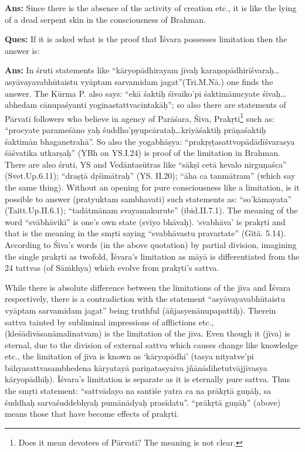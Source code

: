 \textbf{Ans:} Since there is the absence of the activity of creation etc., it is like the lying of a dead serpent skin in the consciousness of Brahman.

\textbf{Ques:} If it is asked what is the proof that Īśvara possesses limitation then the answer is: 

\textbf{Ans:} In śruti statements like “kāryopādhirayam jīvaḥ karaṇopādhirīśvaraḥ…asyāvayavabhūtaistu vyāptam sarvamidam jagat”(Tri.M.Nā.\-) one finds the answer. The Kūrma P. also says: “ekā śaktiḥ śivaiko’pi śaktimānucyate śivaḥ…abhedam cānupaśyanti yoginastattvacintakāḥ”; so also there are statements of Pārvatī followers who believe in agency of Parāśara, Śiva, Prakṛti\footnote{Does it mean devotees of Pārvatī? The meaning is not clear.} such as: “procyate parameśāno yaḥ śuddho’pyupcārataḥ…kriyāśaktiḥ prāṇaśaktiḥ śaktimān bhaganetrahā”.  So also the yogabhāṣya: “prakṛṣṭasattvopādādīśvarasya śāśvatika utkarṣaḥ” (YBh on YS.I.24) is proof of the limitation in Brahman. There are also śruti, YS and Vedāntasūtras like “sākṣī cetā kevalo nirguṇaśca” (Svet.Up.6.11); “draṣṭā dṛśimātraḥ” (YS. II.20); ``āha ca tanmātram” (which say the same thing). Without an opening for pure consciousness like a limitation, is it possible to answer (pratyuktam sambhavati) such statements as: “so’kāmayata” (Taitt.Up.II.6.1); “tadātmānam svayamakurute” (ibid.II.7.1). The meaning of the word “svābhāvikī” is one’s own state (svīyo bhāvaḥ). ‘svabhāva’ is prakṛti and that is the meaning in the smṛti saying “svabhāvastu pravartate” (Gītā. 5.14).  According to Śiva’s words (in the above quotation) by partial division, imagining the single prakṛti as twofold, Īśvara’s limitation as māyā is differentiated from the 24 tattvas (of Sāṁkhya) which evolve from prakṛti’s sattva.

While there is absolute difference between the limitations of the jīva and Īśvara respectively, there is a contradiction with the statement “asyāvayavabhūtaistu vyāptam sarvamidam jagat” being truthful (āñjasyenā\-nupapattiḥ). Therein sattva tainted by subliminal impressions of afflictions etc.,(kleśādivāsanāmalinatvam) is the limitation of the jīva. Even though it (jīva) is eternal, due to the division of external sattva which causes change like knowledge etc., the limitation of jīva is known as ‘kāryopādhi’ (tasya nityatve’pi bāhyasattvasambhedena kāryatayā pariṇatasyaiva jñānādihetutvājjīvasya kāryopādhiḥ). Īśvara’s limitation is separate as it is eternally pure sattva. Thus the smṛti statement: “sattvādayo na santīśe yatra ca na prākṛtā guṇāḥ, sa śuddhaḥ sarvaśuddebhyaḥ pumānādyaḥ prasīdatu”. “prākṛtā guṇāḥ” (above) means those that have become effects of prakṛti. 

